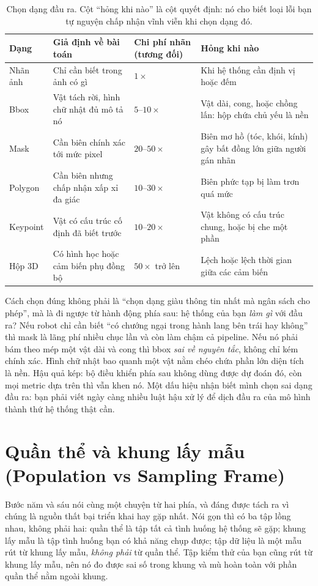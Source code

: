 \documentclass[../../deep_learning.tex]{subfiles}
\begin{document}
\begin{table}[H]\centering\small
\caption{Chọn dạng đầu ra. Cột ``hỏng khi nào'' là cột quyết định: nó cho biết loại lỗi bạn tự nguyện chấp nhận vĩnh viễn khi chọn dạng đó.}
\label{tab:dang-dau-ra}
\begin{tabularx}{\linewidth}{@{}L{1.7cm}YL{1.8cm}Y@{}}
\toprule
\textbf{Dạng} & \textbf{Giả định về bài toán} & \textbf{Chi phí nhãn (tương đối)} & \textbf{Hỏng khi nào}\\
\midrule
Nhãn ảnh & Chỉ cần biết trong ảnh có gì & \(1\times\) & Khi hệ thống cần định vị hoặc đếm\\
Bbox & Vật tách rời, hình chữ nhật đủ mô tả nó & \(5\)--\(10\times\) & Vật dài, cong, hoặc chồng lấn: hộp chứa chủ yếu là nền\\
Mask & Cần biên chính xác tới mức pixel & \(20\)--\(50\times\) & Biên mơ hồ (tóc, khói, kính) gây bất đồng lớn giữa người gán nhãn\\
Polygon & Cần biên nhưng chấp nhận xấp xỉ đa giác & \(10\)--\(30\times\) & Biên phức tạp bị làm trơn quá mức\\
Keypoint & Vật có cấu trúc cố định đã biết trước & \(10\)--\(20\times\) & Vật không có cấu trúc chung, hoặc bị che một phần\\
Hộp 3D & Có hình học hoặc cảm biến phụ đồng bộ & \(50\times\) trở lên & Lệch  hoặc lệch thời gian giữa các cảm biến\\
\bottomrule
\end{tabularx}
\end{table}

Cách chọn đúng không phải là ``chọn dạng giàu thông tin nhất mà ngân sách cho phép'', mà là đi ngược từ hành động phía sau: hệ thống của bạn \emph{làm gì} với đầu ra? Nếu robot chỉ cần biết ``có chướng ngại trong hành lang bên trái hay không'' thì mask là lãng phí nhiều chục lần và còn làm chậm cả pipeline. Nếu nó phải bám theo mép một vật dài và cong thì bbox \emph{sai về nguyên tắc}, không chỉ kém chính xác. Hình chữ nhật bao quanh một vật nằm chéo chứa phần lớn diện tích là nền. Hậu quả kép: bộ điều khiển phía sau không dùng được dự đoán đó, còn mọi metric dựa trên  thì vẫn khen nó.  Một dấu hiệu nhận biết mình chọn sai dạng đầu ra: bạn phải viết ngày càng nhiều luật hậu xử lý để dịch đầu ra của mô hình thành thứ hệ thống thật cần.

\section{Quần thể và khung lấy mẫu (Population vs Sampling Frame)}
Bước năm và sáu nói cùng một chuyện từ hai phía, và đáng được tách ra vì chúng là nguồn thất bại triển khai hay gặp nhất. Nói gọn thì có ba tập lồng nhau, không phải hai: quần thể là tập tất cả tình huống hệ thống sẽ gặp; khung lấy mẫu là tập tình huống bạn có khả năng chụp được; tập dữ liệu là một mẫu rút từ khung lấy mẫu, \emph{không phải} từ quần thể. Tập kiểm thử của bạn cũng rút từ khung lấy mẫu, nên nó đo được sai số trong khung và mù hoàn toàn với phần quần thể nằm ngoài khung.
\end{document}
